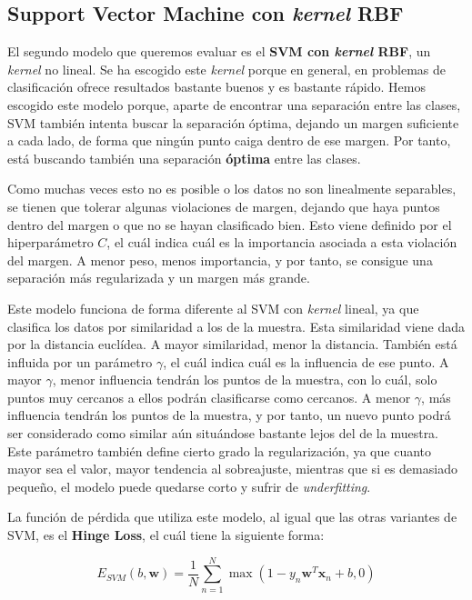 \documentclass[11pt,a4paper]{article}
\begin{document}
\subsection{Support Vector Machine con \textit{kernel} RBF}

El segundo modelo que queremos evaluar es el \textbf{SVM con \textit{kernel} RBF}, un \textit{kernel} no lineal. Se ha escogido este \textit{kernel}
porque en general, en problemas de clasificación ofrece resultados bastante buenos y es bastante rápido. Hemos escogido este modelo porque,
aparte de encontrar una separación entre las clases, SVM también intenta buscar la separación óptima, dejando un margen suficiente a cada
lado, de forma que ningún punto caiga dentro de ese margen. Por tanto, está buscando también una separación \textbf{óptima} entre las clases.

Como muchas veces esto no es posible o los datos no son linealmente separables, se tienen que tolerar algunas violaciones de margen, dejando
que haya puntos dentro del margen o que no se hayan clasificado bien. Esto viene definido por el hiperparámetro $C$, el cuál indica cuál
es la importancia asociada a esta violación del margen. A menor peso, menos importancia, y por tanto, se consigue una separación más
regularizada y un margen más grande.

Este modelo funciona de forma diferente al SVM con \textit{kernel} lineal, ya que clasifica los datos por similaridad a los de la muestra.
Esta similaridad viene dada por la distancia euclídea. A mayor similaridad, menor la distancia. También está influida por un parámetro
$\gamma$, el cuál indica cuál es la influencia de ese punto. A mayor $\gamma$, menor influencia tendrán los puntos de la muestra, con lo cuál,
solo puntos muy cercanos a ellos podrán clasificarse como cercanos. A menor $\gamma$, más influencia tendrán los puntos de la muestra, y por
tanto, un nuevo punto podrá ser considerado como similar aún situándose bastante lejos del de la muestra. Este parámetro también define
cierto grado la regularización, ya que cuanto mayor sea el valor, mayor tendencia al sobreajuste, mientras que si es demasiado pequeño,
el modelo puede quedarse corto y sufrir de \textit{underfitting}.

La función de pérdida que utiliza este modelo, al igual que las otras variantes de SVM, es el \textbf{Hinge Loss}, el cuál tiene la siguiente
forma:

\begin{equation}
\label{eq:hinge-loss}
E_{SVM}(b, \mathbf{w}) = \frac{1}{N} \sum_{n=1}^N \max(1 - y_n \mathbf{w}^T\mathbf{x}_n + b , 0)
\end{equation}
\end{document}
